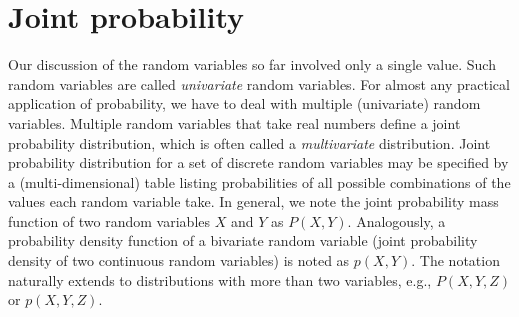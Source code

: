 \begin{marginfigure}
  \caption{\label{fig:normal-t-pdf}%
    Standard normal distribution (blue) in comparison to
    the t-distribution with one degree of freedom ($v = 1$) (orange).
    Note that the t-distribution has more probability mass at the tails.
  }
\end{marginfigure}

\section{Joint probability}

Our discussion of the random variables so far involved
only a single value.
Such random variables are called \emph{univariate} random variables.
For almost any practical application of probability,
we have to deal with multiple (univariate) random variables.
Multiple random variables that take real numbers define a joint probability distribution,
which is often called a \emph{multivariate} distribution.
Joint probability distribution for a set of discrete random variables
may be specified by a (multi-dimensional) table listing probabilities of 
all possible combinations of the values each random variable take.
In general,
we note the joint probability mass function of
two random variables $X$ and $Y$ as $P(X,Y)$.
Analogously,
a probability density function of a bivariate random variable
(joint probability density of two continuous random variables)
is noted as $p(X,Y)$.
The notation naturally extends to distributions with more than two variables,
e.g., $P(X, Y, Z)$ or $p(X, Y, Z)$.

